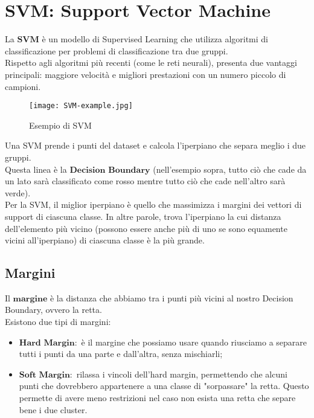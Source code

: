 \section{SVM: Support Vector Machine}
    La $\textbf{SVM}$ è un modello di Supervised Learning che utilizza algoritmi di classificazione per problemi di classificazione tra due gruppi.
    \\[1\baselineskip]
    Rispetto agli algoritmi più recenti (come le reti neurali), presenta due vantaggi principali: maggiore velocità e migliori prestazioni con un numero piccolo di campioni.
    
    \begin{figure}[h]
        \caption{Esempio di SVM}
        \centering
        \texttt{[image: SVM-example.jpg]}
    \end{figure}
    
    \clearpage

    Una SVM prende i punti del dataset e calcola l'iperpiano che separa meglio i due gruppi.
    \\
    Questa linea è la $\textbf{Decision Boundary}$ (nell'esempio sopra, tutto ciò che cade da un lato sarà classificato come rosso mentre tutto ciò che cade nell'altro sarà verde).
    \\[1\baselineskip]
    Per la SVM, il miglior iperpiano è quello che massimizza i margini dei vettori di support di ciascuna classe.
    In altre parole, trova l'iperpiano la cui distanza dell'elemento più vicino (possono essere anche più di uno se sono equamente vicini all'iperpiano) di ciascuna classe è la più grande.

    \subsection{Margini}
        Il $\textbf{margine}$ è la distanza che abbiamo tra i punti più vicini al nostro Decision Boundary, ovvero la retta.
        \\
        Esistono due tipi di margini:
        \begin{itemize}
            \item $\textbf{Hard Margin}:$ è il margine che possiamo usare quando riusciamo a separare tutti i punti da una parte e dall'altra, senza mischiarli;
            \item $\textbf{Soft Margin}:$ rilassa i vincoli dell'hard margin, permettendo che alcuni punti che dovrebbero appartenere a una classe di "sorpassare" la retta.
                Questo permette di avere meno restrizioni nel caso non esista una retta che separe bene i due cluster.
        \end{itemize}

